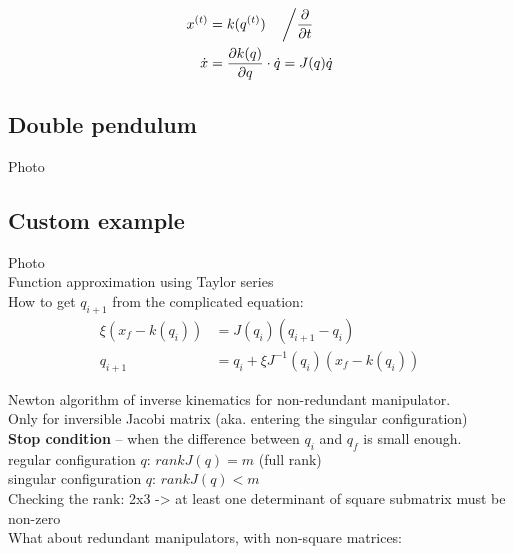 \documentclass[12pt, a4paper]{extarticle}
\begin{document}
	\begin{minipage}{\textwidth}
		\begin{align}
			x^{(t)} &= k(q^{(t)}) \quad \left/ \dfrac{\partial}{\partial t} \right. \\
			\dot{x} &= \dfrac{\partial k(q)}{\partial q} \cdot \dot{q} = J(q) \dot{q}
		\end{align}
	\end{minipage}

	\subsection{Double pendulum}
	Photo

	\subsection{Custom example}
	Photo\\

	Function approximation using Taylor series\\

	How to get $q_{i+1}$ from the complicated equation:\\

	\begin{align}
		\xi \left(x_f - k(q_i)\right) &= J(q_i)\left(q_{i+1} - q_i\right) \\
		q_{i+1} &= q_i + \xi J^{-1}(q_i)(x_f - k(q_i))
	\end{align}

	Newton algorithm of inverse kinematics for non-redundant manipulator.\\

	Only for inversible Jacobi matrix (aka. entering the singular configuration)\\

	\textbf{Stop condition} -- when the difference between $q_i$ and $q_f$ is small enough.\\

	regular configuration $q$: $rank J(q) = m$ (full rank)\\

	singular configuration $q$: $rank J(q) < m$\\

	Checking the rank: 2x3 -> at least one determinant of square submatrix must be non-zero\\

	What about redundant manipulators, with non-square matrices: \\
\end{document}
